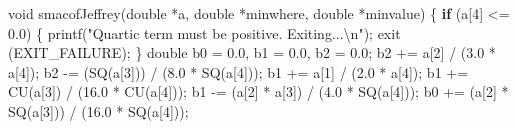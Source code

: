 \documentclass[
  12pt,
  letterpaper,
  DIV=11,
  numbers=noendperiod]{scrreprt}
\newenvironment{Shaded}{\begin{snugshade}}{\end{snugshade}}
\newcommand{\ControlFlowTok}[1]{\textcolor[rgb]{0.00,0.23,0.31}{\textbf{#1}}}
\newcommand{\DataTypeTok}[1]{\textcolor[rgb]{0.68,0.00,0.00}{#1}}
\newcommand{\DecValTok}[1]{\textcolor[rgb]{0.68,0.00,0.00}{#1}}
\newcommand{\FloatTok}[1]{\textcolor[rgb]{0.68,0.00,0.00}{#1}}
\newcommand{\NormalTok}[1]{\textcolor[rgb]{0.00,0.23,0.31}{#1}}
\newcommand{\OperatorTok}[1]{\textcolor[rgb]{0.37,0.37,0.37}{#1}}
\newcommand{\SpecialCharTok}[1]{\textcolor[rgb]{0.37,0.37,0.37}{#1}}
\newcommand{\StringTok}[1]{\textcolor[rgb]{0.13,0.47,0.30}{#1}}
\theoremstyle{remark}
\begin{document}
\begin{Shaded}
\begin{Highlighting}[]
\DataTypeTok{void}\NormalTok{ smacofJeffrey}\OperatorTok{(}\DataTypeTok{double} \OperatorTok{*}\NormalTok{a}\OperatorTok{,} \DataTypeTok{double} \OperatorTok{*}\NormalTok{minwhere}\OperatorTok{,} \DataTypeTok{double} \OperatorTok{*}\NormalTok{minvalue}\OperatorTok{)} \OperatorTok{\{}
    \ControlFlowTok{if} \OperatorTok{(}\NormalTok{a}\OperatorTok{[}\DecValTok{4}\OperatorTok{]} \OperatorTok{\textless{}=} \FloatTok{0.0}\OperatorTok{)} \OperatorTok{\{}
\NormalTok{        printf}\OperatorTok{(}\StringTok{"Quartic term must be positive. Exiting...}\SpecialCharTok{\textbackslash{}n}\StringTok{"}\OperatorTok{);}
\NormalTok{        exit }\OperatorTok{(}\NormalTok{EXIT\_FAILURE}\OperatorTok{);}
    \OperatorTok{\}}
    \DataTypeTok{double}\NormalTok{ b0 }\OperatorTok{=} \FloatTok{0.0}\OperatorTok{,}\NormalTok{ b1 }\OperatorTok{=} \FloatTok{0.0}\OperatorTok{,}\NormalTok{ b2 }\OperatorTok{=} \FloatTok{0.0}\OperatorTok{;}
\NormalTok{    b2 }\OperatorTok{+=}\NormalTok{ a}\OperatorTok{[}\DecValTok{2}\OperatorTok{]} \OperatorTok{/} \OperatorTok{(}\FloatTok{3.0} \OperatorTok{*}\NormalTok{ a}\OperatorTok{[}\DecValTok{4}\OperatorTok{]);}
\NormalTok{    b2 }\OperatorTok{{-}=} \OperatorTok{(}\NormalTok{SQ}\OperatorTok{(}\NormalTok{a}\OperatorTok{[}\DecValTok{3}\OperatorTok{]))} \OperatorTok{/} \OperatorTok{(}\FloatTok{8.0} \OperatorTok{*}\NormalTok{ SQ}\OperatorTok{(}\NormalTok{a}\OperatorTok{[}\DecValTok{4}\OperatorTok{]));}
\NormalTok{    b1 }\OperatorTok{+=}\NormalTok{ a}\OperatorTok{[}\DecValTok{1}\OperatorTok{]} \OperatorTok{/} \OperatorTok{(}\FloatTok{2.0} \OperatorTok{*}\NormalTok{ a}\OperatorTok{[}\DecValTok{4}\OperatorTok{]);}
\NormalTok{    b1 }\OperatorTok{+=}\NormalTok{ CU}\OperatorTok{(}\NormalTok{a}\OperatorTok{[}\DecValTok{3}\OperatorTok{])} \OperatorTok{/} \OperatorTok{(}\FloatTok{16.0} \OperatorTok{*}\NormalTok{ CU}\OperatorTok{(}\NormalTok{a}\OperatorTok{[}\DecValTok{4}\OperatorTok{]));}
\NormalTok{    b1 }\OperatorTok{{-}=} \OperatorTok{(}\NormalTok{a}\OperatorTok{[}\DecValTok{2}\OperatorTok{]} \OperatorTok{*}\NormalTok{ a}\OperatorTok{[}\DecValTok{3}\OperatorTok{])} \OperatorTok{/} \OperatorTok{(}\FloatTok{4.0} \OperatorTok{*}\NormalTok{ SQ}\OperatorTok{(}\NormalTok{a}\OperatorTok{[}\DecValTok{4}\OperatorTok{]));}
\NormalTok{    b0 }\OperatorTok{+=} \OperatorTok{(}\NormalTok{a}\OperatorTok{[}\DecValTok{2}\OperatorTok{]} \OperatorTok{*}\NormalTok{ SQ}\OperatorTok{(}\NormalTok{a}\OperatorTok{[}\DecValTok{3}\OperatorTok{]))} \OperatorTok{/} \OperatorTok{(}\FloatTok{16.0} \OperatorTok{*}\NormalTok{ SQ}\OperatorTok{(}\NormalTok{a}\OperatorTok{[}\DecValTok{4}\OperatorTok{]));}

\end{Highlighting}
\end{Shaded}
\end{document}
